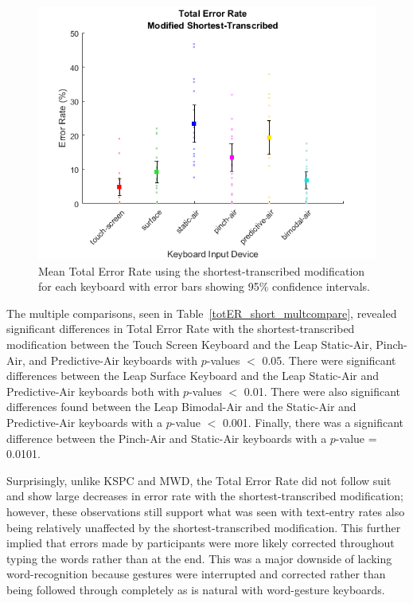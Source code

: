 \begin{figure}[h]
	\centering
	\includegraphics{fig_totER_short_mean}
	\caption[Mean Total Error Rate for Modified-Shortest]{Mean Total Error Rate using the shortest-transcribed modification for each keyboard with error bars showing 95\% confidence intervals.}
	\label{fig_totER_short_mean}
\end{figure}

The multiple comparisons, seen in Table~\ref{totER_short_multcompare}, revealed significant differences in Total Error Rate with the shortest-transcribed modification between the Touch Screen Keyboard and the Leap Static-Air, Pinch-Air, and Predictive-Air keyboards with $p$-values $<$ 0.05. There were significant differences between the Leap Surface Keyboard and the Leap Static-Air and Predictive-Air keyboards both with $p$-values $<$ 0.01. There were also significant differences found between the Leap Bimodal-Air and the Static-Air and Predictive-Air keyboards with a $p$-value $<$ 0.001. Finally, there was a significant difference between the Pinch-Air and Static-Air keyboards with a $p$-value = 0.0101.

Surprisingly, unlike KSPC and MWD, the Total Error Rate did not follow suit and show large decreases in error rate with the shortest-transcribed modification; however, these observations still support what was seen with text-entry rates also being relatively unaffected by the shortest-transcribed modification. This further implied that errors made by participants were more likely corrected throughout typing the words rather than at the end. This was a major downside of lacking word-recognition because gestures were interrupted and corrected rather than being followed through completely as is natural with word-gesture keyboards.

